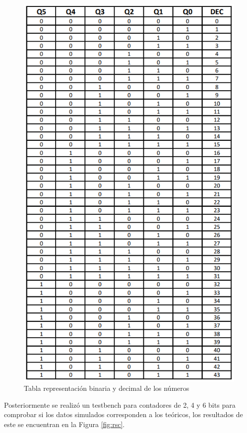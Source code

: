 \documentclass[journal]{IEEEtran}
\begin{document}
	\begin{figure}[htb]
		\centering
		\includegraphics[scale = 0.6]{img/p3/tncbd.png}
		\caption{Tabla representación binaria y decimal de los números}
		\label{fig:tncbd}
	\end{figure}
	
	Posteriormente se realizó un testbench para contadores de 2, 4 y 6 bits para comprobar si los datos simulados corresponden a los teóricos, los resultados de este se encuentran en la Figura \ref{fig:rsc}.
	
\end{document}
